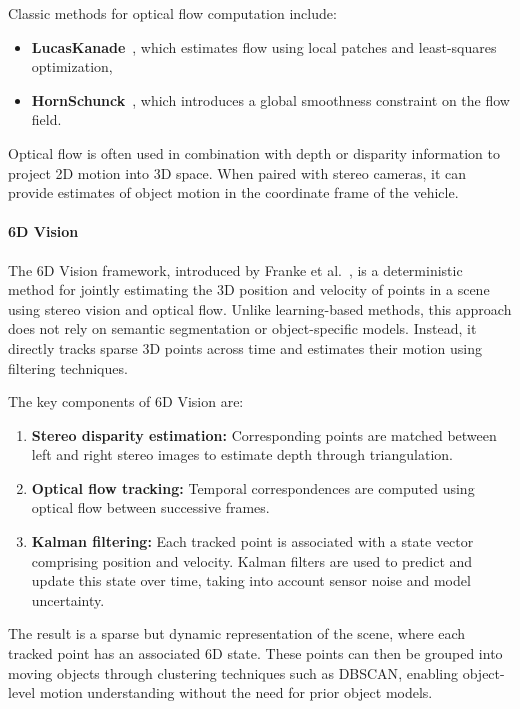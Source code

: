 Classic methods for optical flow computation include:
\begin{itemize}
  \item \textbf{Lucas\-Kanade}~\cite{opt_flw_lukas_canade}, which estimates flow using local patches and least-squares optimization,
  \item \textbf{Horn\-Schunck}~\cite{opt_flw_schunck}, which introduces a global smoothness constraint on the flow field.
\end{itemize}


Optical flow is often used in combination with depth or disparity information to project 2D motion 
into 3D space. When paired with stereo cameras, it can provide estimates of object motion 
in the coordinate frame of the vehicle.

\paragraph{6D Vision}\label{sec:6D_Vision}

The 6D Vision framework, introduced by Franke et al.~\cite{6d_vision_daimler}, is a deterministic 
method for jointly estimating the 3D position and velocity of points in a scene using stereo vision 
and optical flow. Unlike learning-based methods, this approach does not rely on semantic segmentation 
or object-specific models. Instead, it directly tracks sparse 3D points across time and estimates 
their motion using filtering techniques.

The key components of 6D Vision are:

\begin{enumerate}
  \item \textbf{Stereo disparity estimation:} Corresponding points are matched between left and right stereo images to estimate depth through triangulation.
  \item \textbf{Optical flow tracking:} Temporal correspondences are computed using optical flow between successive frames.
  \item \textbf{Kalman filtering:} Each tracked point is associated with a state vector comprising position and velocity. Kalman filters are used to predict and update this state over time, taking into account sensor noise and model uncertainty.
\end{enumerate}

The result is a sparse but dynamic representation of the scene, where each tracked point has an associated 6D state. 
These points can then be grouped into moving objects through clustering techniques such as \gls{DBSCAN}, enabling object-level 
motion understanding without the need for prior object models.

